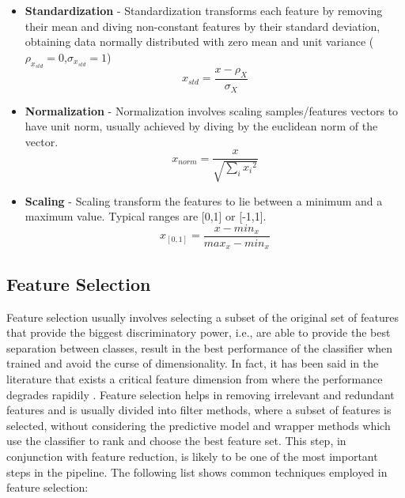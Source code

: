 \begin{itemize}
\item \textbf{Standardization} - Standardization transforms each feature by removing their mean and diving non-constant features by their standard deviation, obtaining data normally distributed with zero mean and unit variance ($\rho_{x_{std}}=0$,$\sigma_{x_{std}}=1$)
\[x_{std} = \frac{x - \rho _{X}}{\sigma _{X}}\]
\item \textbf{Normalization} - Normalization involves scaling samples/features vectors to have unit norm, usually achieved by diving by the euclidean norm of the vector.
\[x_{norm} = \frac{x }{\sqrt{\sum_i{x_{i}}^{2}}} \]
\item \textbf{Scaling} - Scaling transform the features to lie between a minimum and a maximum value. Typical ranges are [0,1] or [-1,1]. 
\[x_{[0,1]} = \frac{x - min _{x}}{max _{x} - min _{x}}\]
\end{itemize}

\subsection{Feature Selection}
Feature selection usually involves selecting a subset of the original set of features that provide the biggest discriminatory power, i.e., are able to provide the best separation between classes, result in the best performance of the classifier when trained and avoid the curse of dimensionality. In fact, it has been said in the literature that exists a critical feature dimension from where the performance degrades rapidily \citep{Ribeiro2015CFD}. Feature selection helps in removing irrelevant and redundant features and is usually divided into filter methods, where a subset of features is selected, without considering the predictive model and wrapper methods which use the classifier to rank and choose the best feature set. This step, in conjunction with feature reduction, is likely to be one of the most important steps in the pipeline. The following list shows common techniques employed in feature selection:

